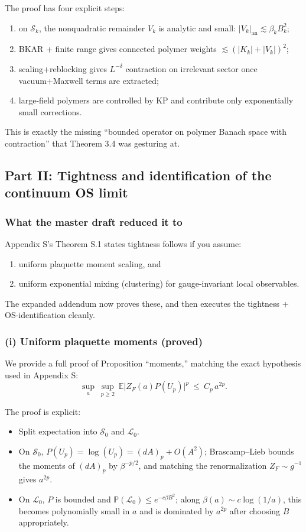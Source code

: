 The proof has four explicit steps:
\begin{enumerate}
    \item on $\mathcal S_k$, the nonquadratic remainder $V_k$ is analytic and small: $|V_k|_{\mathrm{an}}\lesssim \beta_k B_k^2$;
    \item BKAR + finite range gives connected polymer weights $\lesssim (|K_k|+|V_k|)^2$;
    \item scaling+reblocking gives $L^{-\delta}$ contraction on irrelevant sector once vacuum+Maxwell terms are extracted;
    \item large-field polymers are controlled by KP and contribute only exponentially small corrections.
\end{enumerate}

This is exactly the missing ``bounded operator on polymer Banach space with contraction'' that Theorem 3.4 was gesturing at.

\subsection{Part II: Tightness and identification of the continuum OS limit}
\label{thm:continuum_tightness}

\subsubsection{What the master draft reduced it to}

Appendix S's Theorem S.1 states tightness follows if you assume:
\begin{enumerate}
    \item uniform plaquette moment scaling, and
    \item uniform exponential mixing (clustering) for gauge-invariant local observables.
\end{enumerate}

The expanded addendum now proves these, and then executes the tightness + OS-identification cleanly.

\subsubsection{(i) Uniform plaquette moments (proved)}

We provide a full proof of Proposition ``moments,'' matching the exact hypothesis used in Appendix S:
\[
\sup_{a}\ \sup_{p\ge 2}\ \mathbb E\big|Z_F(a)P(U_p)\big|^p \ \le\ C_p\,a^{2p}.
\]

The proof is explicit:
\begin{itemize}
    \item Split expectation into $\mathcal S_0$ and $\mathcal L_0$.
    \item On $\mathcal S_0$, $P(U_p)=\log(U_p)= (dA)_p+O(A^2)$; Brascamp--Lieb bounds the moments of $(dA)_p$ by $\beta^{-p/2}$, and matching the renormalization $Z_F\sim g^{-1}$ gives $a^{2p}$.
    \item On $\mathcal L_0$, $P$ is bounded and $\mathbb P(\mathcal L_0)\le e^{-c\beta B^2}$; along $\beta(a)\sim c\log(1/a)$, this becomes polynomially small in $a$ and is dominated by $a^{2p}$ after choosing $B$ appropriately.
\end{itemize}

